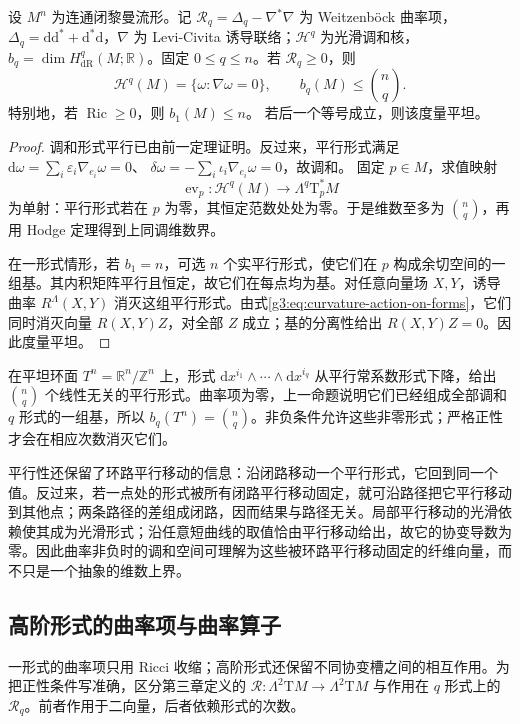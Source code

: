 \begin{proposition}\label{g3:prop:nonnegative-curvature-betti-bound}
	设 \(M^n\) 为连通闭黎曼流形。记 \(\mathcal R_q=\Delta_q-\nabla^*\nabla\) 为 Weitzenböck 曲率项，\(\Delta_q=\mathrm d\mathrm d^*+\mathrm d^*\mathrm d\)，\(\nabla\) 为 Levi-Civita 诱导联络；\(\mathcal H^q\) 为光滑调和核，\(b_q=\dim H_{\mathrm{dR}}^q(M;\mathbb R)\)。固定 \(0\le q\le n\)。若 \(\mathcal R_q\ge0\)，则
	\[
		\mathcal H^q(M)=\{\omega:\nabla\omega=0\},\qquad
		b_q(M)\le\binom nq.
	\]
	特别地，若 \(\operatorname{Ric}\ge0\)，则 \(b_1(M)\le n\)。
	若后一个等号成立，则该度量平坦。
\end{proposition}
\begin{proof}
	调和形式平行已由前一定理证明。反过来，平行形式满足
	\(\mathrm d\omega=\sum_i\varepsilon_i\nabla_{e_i}\omega=0\)、
	\(\delta\omega=-\sum_i\iota_i\nabla_{e_i}\omega=0\)，故调和。
	固定 \(p\in M\)，求值映射
	\[
		\operatorname{ev}_p:\mathcal H^q(M)\longrightarrow\Lambda^q\mathrm T_p^*M
	\]
	为单射：平行形式若在 \(p\) 为零，其恒定范数处处为零。于是维数至多为 \(\binom nq\)，再用 Hodge 定理得到上同调维数界。

	在一形式情形，若 \(b_1=n\)，可选 \(n\) 个实平行形式，使它们在 \(p\) 构成余切空间的一组基。其内积矩阵平行且恒定，故它们在每点均为基。对任意向量场 \(X,Y\)，诱导曲率 \(R^\Lambda(X,Y)\) 消灭这组平行形式。由式\eqref{g3:eq:curvature-action-on-forms}，它们同时消灭向量 \(R(X,Y)Z\)，对全部 \(Z\) 成立；基的分离性给出 \(R(X,Y)Z=0\)。因此度量平坦。
\end{proof}

\begin{example}\label{g3:exm:flat-torus-parallel-forms}
	在平坦环面 \(T^n=\mathbb R^n/\mathbb Z^n\) 上，形式
	\(\mathrm dx^{i_1}\wedge\cdots\wedge\mathrm dx^{i_q}\)
	从平行常系数形式下降，给出 \(\binom nq\) 个线性无关的平行形式。曲率项为零，上一命题说明它们已经组成全部调和 \(q\) 形式的一组基，所以
	\(b_q(T^n)=\binom nq\)。非负条件允许这些非零形式；严格正性才会在相应次数消灭它们。
\end{example}

平行性还保留了环路平行移动的信息：沿闭路移动一个平行形式，它回到同一个值。反过来，若一点处的形式被所有闭路平行移动固定，就可沿路径把它平行移动到其他点；两条路径的差组成闭路，因而结果与路径无关。局部平行移动的光滑依赖使其成为光滑形式；沿任意短曲线的取值恰由平行移动给出，故它的协变导数为零。因此曲率非负时的调和空间可理解为这些被环路平行移动固定的纤维向量，而不只是一个抽象的维数上界。

\subsection{高阶形式的曲率项与曲率算子}
\label{g3:subsec:1503:05}
一形式的曲率项只用 Ricci 收缩；高阶形式还保留不同协变槽之间的相互作用。为把正性条件写准确，区分第三章定义的
\(\mathcal R:\Lambda^2\mathrm TM\to\Lambda^2\mathrm TM\)
与作用在 \(q\) 形式上的 \(\mathcal R_q\)。前者作用于二向量，后者依赖形式的次数。

